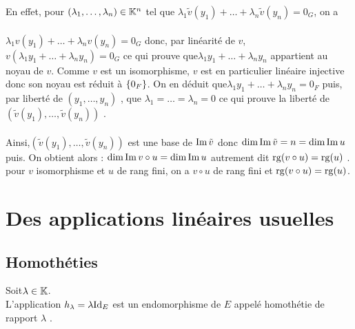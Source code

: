 \begin{dem}
\begin{itemize}
\begin{enumerate}
\begin{itemize}
                    En effet, pour \((\lambda_1, \dots , \lambda_n) \in  \mathbb{K}^n\) tel que \(\lambda_1\tilde{v}(y_1) + \dots + \lambda_n\tilde{v}(y_n) = 0_G\), on a\\~\\
                    \(\lambda_1v(y_1) + \dots + \lambda_nv(y_n) = 0_G\) donc, par linéarité de \(v\),\( v (\lambda_1y_1 + \dots + \lambda_ny_n) = 0_G\) ce qui prouve que\( \lambda_1y_1 + \dots + \lambda_ny_n\) appartient au noyau de \(v\). Comme \(v\) est un isomorphisme, \(v\) est en particulier linéaire injective donc son noyau est réduit à \(\left\lbrace0_F \right\rbrace\). On en déduit que\( \lambda_1y_1 + \dots + \lambda_ny_n = 0_F\) puis, par liberté de \((y_1, \dots , y_n)\) , que \(\lambda_1 = \dots = \lambda_n = 0\) ce qui prouve la liberté de \((\tilde{v}(y_1), \dots , \tilde{v}(y_n))\) .\\~\\
                    Ainsi,\( (\tilde{v}(y_1), \dots , \tilde{v}(y_n))\) est une base de \(\operatorname{Im} \tilde{v}\) donc \(\dim \operatorname{Im} \tilde{v} = n = \dim \operatorname{Im} u\) puis. On obtient alors : \(\dim \operatorname{Im} v \circ u = \dim \operatorname{Im} u\) autrement dit \(\operatorname{rg} (v \circ u) = \operatorname{rg} (u)\) .\\
                    \conclusion pour \(v\) isomorphisme et \(u\) de rang fini, on a \(v\circ u\) de rang fini et \(\operatorname{rg} (v\circ u) = \operatorname{rg} (u)\).
                \end{itemize}
        \end{enumerate}
    \end{itemize}
\end{dem}
\section{Des applications linéaires usuelles}
\subsection{Homothéties}
\begin{defi}
   Soit\( \lambda  \in  \mathbb{K}\).\\
    L’application \(h_{\lambda}  = \lambda \mathrm{Id}_{E}\) est un endomorphisme de \(E\) appelé homothétie de rapport \(\lambda\) .
\end{defi}

